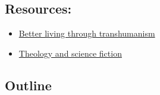 \hypertarget{resources}{%
\subsection{Resources:}\label{resources}}

\begin{itemize}
\tightlist
\item
  \href{https://jetpress.org/v19/dvorsky.htm}{Better living through transhumanism}
\item
  \href{https://www.goodreads.com/book/show/32274841-theology-and-science-fiction}{Theology and science fiction}
\end{itemize}

\hypertarget{outline}{%
\subsection{Outline}\label{outline}}

